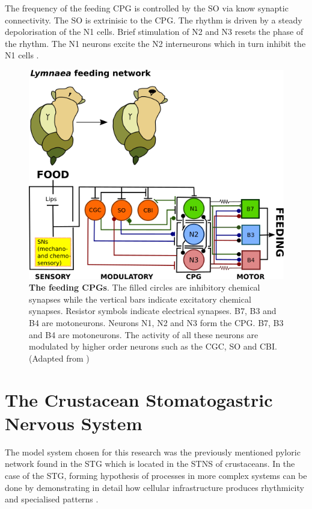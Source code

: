 The frequency of the feeding \ac{CPG} is controlled by the \ac{SO} via know synaptic connectivity. The \ac{SO} is extrinisic to the \ac{CPG}. The rhythm is driven by a steady depolorisation of the N1 cells. Brief stimulation of N2 and N3 resets the phase of the rhythm. The N1 neurons excite the N2 interneurons which in turn inhibit the N1 cells \cite{Elliott1985}.

 \begin{figure}[H]
 	\centering
 	\includegraphics[width=\columnwidth]{graphics/lymnaea_a.png}
 	\caption[]{\textbf{The  feeding \acp{CPG}}. The filled circles are inhibitory chemical synapses while the vertical bars indicate excitatory chemical synapses. Resistor symbols indicate electrical synapses. B7, B3 and B4 are motoneurons. Neurons N1, N2 and N3 form the \ac{CPG}. B7, B3 and B4 are motoneurons. The activity of all these neurons are modulated by higher order neurons such as the \ac{CGC}, \ac{SO} and \ac{CBI}. (Adapted from \cite{Benjamin2008})}
 	\label{fig:Lymnaea_feeding_network}
 \end{figure}

\section{The Crustacean Stomatogastric Nervous System}
The model system chosen for this research was the previously mentioned pyloric network found in the \ac{STG} which is located in the \ac{STNS} of crustaceans. In the case of the \ac{STG}, forming hypothesis of processes in more complex systems can be done by demonstrating in detail how cellular infrastructure produces rhythmicity and specialised patterns \cite{Selverston2010}.

